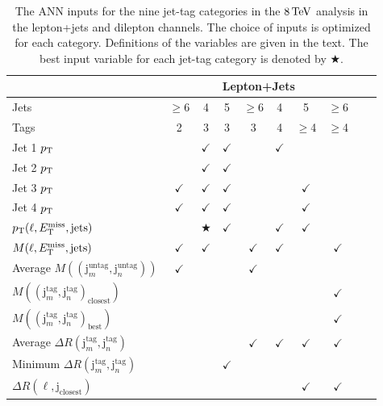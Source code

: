\begin{table}[htp]
        
  \centering
  \noindent
  \small
  \caption{The ANN inputs for the nine jet-tag categories in the $8 \,\text{Te\hspace{-.08em}V}$ \ttH analysis in the lepton+jets and dilepton channels. The choice of inputs
is optimized for each category. Definitions of the variables are given
in the text. The best input variable for each jet-tag category is denoted by 
$\bigstar$.}
    \label{tab:inputs}
    \begin{tabular}{|l|c|c|c|c|c|c|c||c|c|} \hline
& \multicolumn{7}{c|}{Lepton+Jets} \\ \hline
Jets& $\geq$6 & 4 & 5 & $\geq$6 & 4 & 5 & $\geq$6 \\
Tags & 2 & 3 & 3 & 3 & 4 & $\geq$4 & $\geq$4 \\ \hline \hline
Jet 1 $p_{\mathrm{T}}$ & & $\checkmark$ & $\checkmark$ & & $\checkmark$ & & \\
Jet 2 $p_{\mathrm{T}}$ & & $\checkmark$ & $\checkmark$ & & & &  \\
Jet 3 $p_{\mathrm{T}}$ & $\checkmark$ & $\checkmark$ & $\checkmark$ & & & $\checkmark$ &   \\
Jet 4 $p_{\mathrm{T}}$ & $\checkmark$ & $\checkmark$ & $\checkmark$ & & & $\checkmark$ &  \\
$p_{\mathrm{T}}(\ell,E_{\mathrm{T}}^{\text{miss}},\text{jets})$ & & $\bigstar$ & $\checkmark$ & & $\checkmark$ & $\checkmark$ & \\
$M(\ell,E_{\mathrm{T}}^{\text{miss}},\text{jets})$ & $\checkmark$ & $\checkmark$ & & $\checkmark$ & $\checkmark$ & & $\checkmark$  \\
Average $M((\text{j}_m^{\text{untag}},\text{j}_n^{\text{untag}}))$ & $\checkmark$ & & & $\checkmark$ & & &  \\
$M((\text{j}_m^{\text{tag}},\text{j}_n^{\text{tag}})_{\text{closest}})$ & & & & & & & $\checkmark$  \\
$M((\text{j}_m^{\text{tag}},\text{j}_n^{\text{tag}})_{\text{best}})$ & & & & & & & $\checkmark$  \\
Average $\Delta R(\text{j}_m^{\text{tag}},\text{j}_n^{\text{tag}})$ & & & & $\checkmark$ & $\checkmark$ & $\checkmark$ & $\checkmark$  \\
Minimum $\Delta R(\text{j}_m^{\text{tag}},\text{j}_n^{\text{tag}})$ & & & $\checkmark$ & & & & \\
$\Delta R(\ell,\text{j}_{\text{closest}})$ & & & & & & $\checkmark$ & $\checkmark$ \\

\end{tabular}
\end{table}
